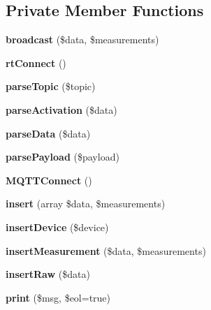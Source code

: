 \subsection*{Private Member Functions}
\begin{DoxyCompactItemize}
\item 
\mbox{\label{class_data_server_af0ea94183a6f28ecb568e13321d109e5}} 
{\bfseries broadcast} (\$data, \$measurements)
\item 
\mbox{\label{class_data_server_aa22496921de05f8626d82a7530fcc517}} 
{\bfseries rt\+Connect} ()
\item 
\mbox{\label{class_data_server_a52c0cb0c5e24744464bdd99e3a30918b}} 
{\bfseries parse\+Topic} (\$topic)
\item 
\mbox{\label{class_data_server_a7d08a7d1b70ec3b36068ba0b90ce3789}} 
{\bfseries parse\+Activation} (\$data)
\item 
\mbox{\label{class_data_server_a8f7697504c81243ae76becd645ed559a}} 
{\bfseries parse\+Data} (\$data)
\item 
\mbox{\label{class_data_server_a3b04dccdc23ed2e26c9efaedb75020ba}} 
{\bfseries parse\+Payload} (\$payload)
\item 
\mbox{\label{class_data_server_af355edd34f94d0643a98664a966a9658}} 
{\bfseries M\+Q\+T\+T\+Connect} ()
\item 
\mbox{\label{class_data_server_a8688edf03a7619385a7d660246de94f5}} 
{\bfseries insert} (array \$data, \$measurements)
\item 
\mbox{\label{class_data_server_a676c6bd5a07581c425e80bba5806d069}} 
{\bfseries insert\+Device} (\$device)
\item 
\mbox{\label{class_data_server_a99669650a90babec68e45269aaf62b8a}} 
{\bfseries insert\+Measurement} (\$data, \$measurements)
\item 
\mbox{\label{class_data_server_adbc339abc8c1c7ba7397d1c26885adfa}} 
{\bfseries insert\+Raw} (\$data)
\item 
\mbox{\label{class_data_server_ae86e92ed03b6395cfc4cb99e2371e14a}} 
{\bfseries print} (\$msg, \$eol=true)
\end{DoxyCompactItemize}
